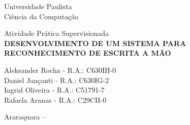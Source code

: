 \begin{center}
	\Huge Universidade Paulista\\
	\large Ciência da Computação
	
	\vfill
	
	\large Atividade Prática Supervisionada\\
	\textbf{\MakeUppercase{DESENVOLVIMENTO DE UM SISTEMA PARA}}\\
	\textbf{\MakeUppercase{RECONHECIMENTO DE ESCRITA A MÃO}}
	
	\bigskip
	\bigskip
	
	\normalsize{
		Aleksander Rocha - R.A.: C630IH-0\\
		Daniel Jançanti - R.A.: C630IG-2\\
		Ingrid Oliveira - R.A.: C51791-7\\
		Rafaela Aranas - R.A.: C29CII-0\\
	}
	
	\vfill
	
	Araraquara -- \the\year

\end{center}

\thispagestyle{empty}